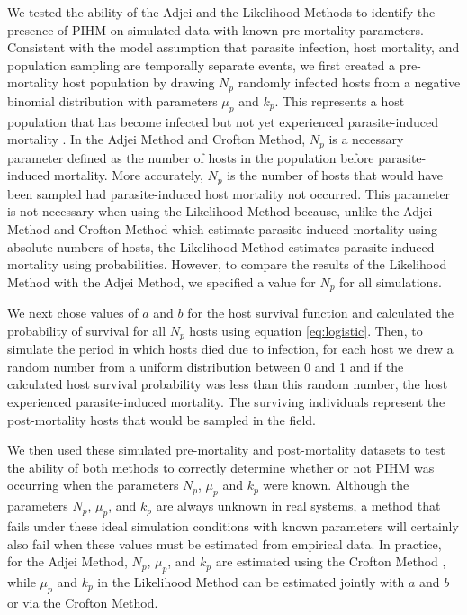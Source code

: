 \documentclass[12pt, a4paper]{article}
\begin{document}
We tested the ability of the Adjei and the Likelihood Methods to identify the presence of PIHM on simulated data with known pre-mortality parameters. Consistent with the model assumption that parasite infection, host mortality, and population sampling are temporally separate events, we first created a pre-mortality host population by drawing $N_p$ randomly infected hosts from a
negative binomial distribution with parameters $\mu_p$ and $k_p$. This represents a host population that has become infected but not yet experienced parasite-induced mortality \citep{Adjei1986}.  In the Adjei Method and Crofton Method, $N_p$ is a necessary parameter defined as the number of hosts in the population before parasite-induced mortality. More accurately, $N_p$  is the number of hosts that would have been sampled had parasite-induced host mortality not occurred.  This parameter is not necessary when using the Likelihood Method because, unlike the Adjei Method and Crofton Method which estimate parasite-induced mortality using absolute numbers of hosts, the Likelihood Method estimates parasite-induced mortality using probabilities. However, to compare the results of the Likelihood Method with the Adjei Method, we specified a value for $N_p$ for all simulations.

We next chose values of $a$ and $b$ for the host survival function and calculated the probability of survival
for all $N_p$ hosts using equation \ref{eq:logistic}.  Then, to simulate the period in which hosts died due to infection, for each host we drew a random number from a uniform distribution
between 0 and 1 and if the calculated host survival probability was less than this random
number, the host experienced parasite-induced mortality.  The surviving individuals represent the post-mortality hosts that would be sampled in the field.

We then used these simulated pre-mortality and post-mortality datasets to test the
ability of both methods to correctly determine whether or not PIHM was
occurring when the parameters $N_p$, $\mu_p$ and $k_p$ were known.  Although
the parameters $N_p$, $\mu_p$, and $k_p$ are always unknown in real systems, a
method that fails under these ideal simulation conditions with known parameters will certainly also fail when these values must be estimated from empirical data. In practice, for the Adjei Method, $N_p$, $\mu_p$,
and $k_p$ are estimated using the Crofton Method \citep{Adjei1986}, while $\mu_p$ and $k_p$ in
the Likelihood Method can be estimated jointly with $a$ and $b$ or via the
Crofton Method.
\end{document}
